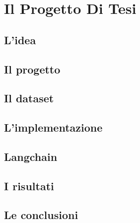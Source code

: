 \chapter{Il Progetto Di Tesi}
\section{L'idea}
\section{Il progetto}
\section{Il dataset}
\section{L'implementazione}
\section{Langchain}
\section{I risultati}
\section{Le conclusioni}
